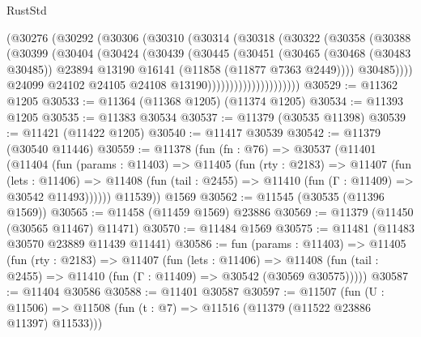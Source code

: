 \begin{lexlean}{RustStd}
\begin{coremodule}
                          (@30276
                            (@30292
                              (@30306
                                (@30310
                                  (@30314
                                    (@30318
                                      (@30322
                                        (@30358
                                          (@30388
                                            (@30399
                                              (@30404
                                                (@30424
                                                  (@30439
                                                    (@30445
                                                      (@30451
                                                        (@30465
                                                          (@30468 (@30483 @30485))
                                                          @23894
                                                          @13190
                                                          @16141
                                                          (@11858 (@11877 @7363 @2449))))
                                                      @30485))))
                                              @24099
                                              @24102
                                              @24105
                                              @24108
                                              @13190)))))))))))))))))))))
@30529 := @11362 @1205
@30533 := @11364 (@11368 @1205) (@11374 @1205)
@30534 := @11393 @1205
@30535 := @11383 @30534
@30537 := @11379 (@30535 @11398)
@30539 := @11421 (@11422 @1205)
@30540 := @11417 @30539
@30542 := @11379 (@30540 @11446)
@30559 := @11378
    (fun (fn : @76) =>
    @30537
      (@11401
        (@11404
          (fun (params : @11403) =>
          @11405
            (fun (rty : @2183) =>
            @11407
              (fun (lets : @11406) =>
              @11408 (fun (tail : @2455) => @11410 (fun (Γ : @11409) => @30542 @11493))))))
        @11539))
    @1569
@30562 := @11545 (@30535 (@11396 @1569))
@30565 := @11458 (@11459 @1569) @23886
@30569 := @11379 (@11450 (@30565 @11467) @11471)
@30570 := @11484 @1569
@30575 := @11481 (@11483 @30570 @23889 @11439 @11441)
@30586 := fun (params : @11403) =>
  @11405
    (fun (rty : @2183) =>
    @11407
      (fun (lets : @11406) =>
      @11408 (fun (tail : @2455) => @11410 (fun (Γ : @11409) => @30542 (@30569 @30575)))))
@30587 := @11404 @30586
@30588 := @11401 @30587
@30597 := @11507
    (fun (U : @11506) => @11508 (fun (t : @7) => @11516 (@11379 (@11522 @23886 @11397) @11533)))

\end{coremodule}
\end{lexlean}
